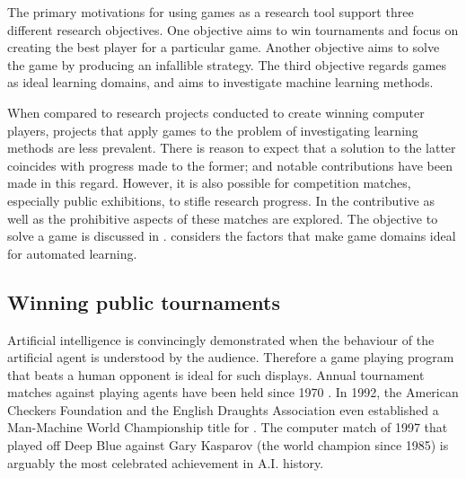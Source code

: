 The primary motivations for using games as a research tool support three different research objectives.  One objective aims to win tournaments and focus on creating the best player for a particular game.  Another objective aims to solve the game by producing an infallible strategy. The third objective regards games as ideal learning domains, and aims to investigate machine learning methods.

When compared to research projects conducted to create winning computer players, projects that apply games to the problem of investigating learning methods are less prevalent. There is reason to expect that a solution to the latter coincides with progress made to the former; and notable contributions have been made in this regard.  However, it is also possible for competition matches, especially public exhibitions, to stifle research progress. In  the contributive as well as the prohibitive aspects of these matches are explored. The objective to solve a game is discussed in .  considers the factors that make game domains ideal for automated learning.


\subsection{Winning public tournaments}
\label{sec:winning}
Artificial intelligence is convincingly demonstrated when the behaviour of the artificial agent is understood by the audience. Therefore a game playing program that beats a human opponent is ideal for such displays. Annual tournament matches against  playing agents have been held since 1970 \cite{donskoy:grace}.  In 1992, the American Checkers Foundation and the English Draughts Association even established a Man-Machine World Championship title for  \cite{schaeffer:solving}. The computer  match of 1997 that played off Deep Blue against Gary Kasparov (the world  champion since 1985) is arguably the most celebrated achievement in A.I. history.

